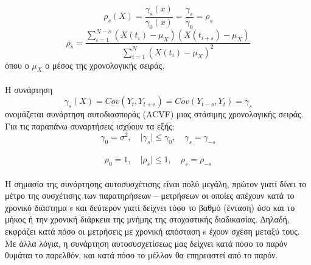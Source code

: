 $$ \rho_s\left(X\right)=\frac{\gamma_s\left(x\right)}{\gamma_0\left(x\right)}=\frac{\gamma_s}{\gamma_0}=\rho_s $$
$$ \rho_s=\frac{\sum_{i=1}^{N-s} \left(X\left(t_i\right)-\mu_X\right)\left(X\left(t_{i+s}\right)-\mu_X\right)}{\sum_{i=1}^{N} \left(X\left(t_i\right)
-\mu_X\right)^2} $$
όπου ο $ \mu_X$
ο μέσος της χρονολογικής σειράς.\\\\
Η συνάρτηση
 $$ \gamma_s \left(X\right)=Cov\left(Y_t,Y_{t+s}\right)=Cov\left(Y_{t-s},Y_t\right)=\gamma_s $$ ονομάζεται συνάρτηση αυτοδιασποράς (ACVF) μιας στάσιμης χρονολογικής σειράς.\\
Για τις παραπάνω συναρτήσεις ισχύουν τα εξής:\\
$$\gamma_0=\sigma^2, \quad \vert \gamma_s\vert \leq \gamma_0, \quad \gamma_s=\gamma_{-s}$$\\
$$ \rho_0=1,\quad \vert\rho_s\vert \leq 1,\quad \rho_s=\rho_{-s} $$\\

Η σημασία της συνάρτησης αυτοσυσχέτισης είναι πολύ μεγάλη, πρώτον γιατί δίνει το μέτρο της συσχέτισης των παρατηρήσεων – μετρήσεων οι οποίες απέχουν
κατά το χρονικό διάστημα s και δεύτερον γιατί δείχνει τόσο το βαθμό (ένταση) όσο
και το μήκος ή την χρονική διάρκεια της μνήμης της στοχαστικής διαδικασίας.
∆ηλαδή, εκφράζει κατά πόσο οι μετρήσεις με χρονική απόσταση s έχουν σχέση
μεταξύ τους. Με άλλα λόγια, η συνάρτηση αυτοσυσχετίσεως μας δείχνει κατά πόσο
το παρόν θυμάται το παρελθόν, και κατά πόσο το μέλλον θα επηρεαστεί από το παρόν.








\endinput
